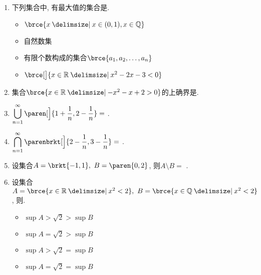 \documentclass[a4paper,punct=CCT]{ctexbook}
\theoremstyle{break}
\newif\ifshowsol
\begin{document}
\begin{enumerate}
\item 下列集合中, 有最大值的集合是\uline{\makebox[4em]{}}.
  \begin{itemize}
    \renewcommand{\labelitemi}{\faCircleThin}
  \item \(\brce{x \mid x \in (0, 1), x \in \Q}\)
  \item 自然数集
    \ifshowsol
  \item[\faCircle] 有限个数构成的集合\(\brce{a_1, a_2, \dots, a_n}\)
    \else
  \item 有限个数构成的集合\(\brce{a_1, a_2, \dots, a_n}\)
    \fi
  \item \(\brce[\big]{x \in \R \mid x^2 - 2x -3 < 0}\)
  \end{itemize}

\item 集合\(\brce{x \in \R \mid -x^2 - x + 2 > 0}\)的上确界是\ifshowsol
  \uline{\makebox[4em]{\(1\)}}\else\uline{\makebox[4em]{}}\fi.

\item \(\displaystyle \bigcup_{n=1}^\infty \paren[\Big]{1 + \frac1n, 2 - \frac1n} =\)
  \ifshowsol\uline{\makebox[4em]{\((1, 2)\)}}\else\uline{\makebox[4em]{}}\fi.

\item \(\displaystyle \bigcap_{n=1}^\infty \parenbrkt[\Big]{2-\frac1n, 3-\frac1n} =\)
  \ifshowsol\uline{\makebox[4em]{\(\brce{2}\)}}\else\uline{\makebox[4em]{}}\fi.

\item 设集合\(A = \brkt{-1,1},\ B = \paren{0,2}\), 则\(A \setminus B =\)
  \ifshowsol\uline{\makebox[4em]{\(\brkt{-1,0}\)}}\else\uline{\makebox[4em]{}}\fi.

\item 设集合\(A = \brce{x \in \R \mid x^2 < 2},\ B = \brce{x \in \Q \mid x^2 < 2}\), 则\uline{\makebox[4em]{}}.
  \begin{itemize}
    \renewcommand{\labelitemi}{\faCircleThin}
  \item \(\sup A > \sqrt2 > \sup B\)
  \item \(\sup A = \sqrt2 > \sup B\)
  \item \(\sup A > \sqrt2 = \sup B\)
    \ifshowsol
  \item[\faCircle] \(\sup A = \sqrt2 = \sup B\)
    \else
  \item \(\sup A = \sqrt2 = \sup B\)
    \fi
  \end{itemize}


\end{enumerate}
\end{document}
